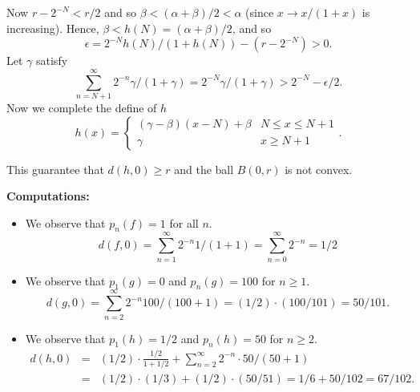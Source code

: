 \begin{enumerate}
Now \(r - 2^{-N} < r/2\) and so \(\beta < (\alpha+\beta)/2 < \alpha\)
(since \(x \rightarrow x/(1+x)\) is increasing).
Hence, \(\beta < h(N) = (\alpha+\beta)/2\), and so 
\begin{equation*}
\epsilon = 2^{-N}h(N)/(1+h(N)) - (r - 2^{-N}) > 0.
\end{equation*}
Let \(\gamma\) satisfy 
\begin{equation*}
 \sum_{n=N+1}^\infty 2^{-n} \gamma/(1+\gamma) = 2^{-N} \gamma/(1+\gamma) 
 > 2^{-N} - \epsilon/2.
\end{equation*}
Now we complete the define of $h$
\begin{equation*}
 h(x) = \left\{\begin{array}{lc}
               (\gamma - \beta)(x-N) + \beta &  N \leq x \leq N+1 \\
               \gamma                        & x \geq N + 1
               \end{array}\right..
\end{equation*}

This guarantee that \(d(h,0) \geq r\) and the ball \(B(0,r)\) is not convex.

\textbf{Computations:}

\begin{itemize}

 \item 
 We observe that \(p_n(f) = 1\) for all $n$.
 \begin{equation*}
 d(f,0) = \sum_{n=1}^\infty 2^{-n} 1/(1 + 1) = \sum_{n=0}^\infty 2^{-n} = 1/2
 \end{equation*}

 \item
 We observe that \(p_1(g) = 0\) and \(p_n(g) = 100\) for \(n\geq 1\).
 \begin{equation*}
 d(g,0) = \sum_{n=2}^\infty 2^{-n} 100/(100 + 1) = 
      (1/2)\cdot (100/101) = 50/101.
 \end{equation*}


 \item
 We observe that \(p_1(h) = 1/2\) and \(p_n(h) = 50\) for \(n\geq 2\).
 \begin{eqnarray*}
 d(h,0) 
  &=& (1/2)\cdot\frac{1/2}{1+1/2} + \sum_{n=2}^\infty 2^{-n} \cdot 50/(50+1) \\
  &=& (1/2)\cdot(1/3) + (1/2)\cdot(50/51) = 1/6 + 50/102 = 67/102.
 \end{eqnarray*}

\end{itemize}



\end{enumerate}
